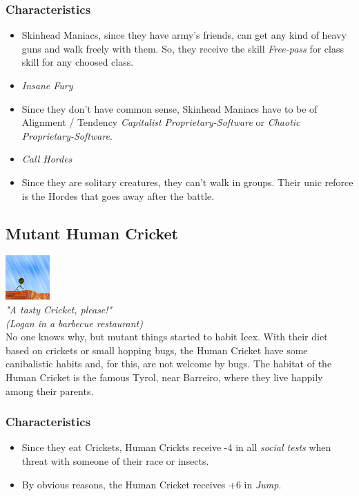 \documentclass[ letterpaper,12pt]{article}
\begin{document}
\subsubsection{Characteristics}
\begin{itemize}
\item{Skinhead Maniacs, since they have army's friends, can get any kind of heavy guns and walk freely with them. So, they receive the skill {\it Free-pass} for class skill for any choosed class.}
\item{{\it Insane Fury}}
\item{Since they don't have common sense, Skinhead Maniacs have to be of Alignment / Tendency {\it Capitalist Proprietary-Software} or {\it Chaotic Proprietary-Software}.}
\item{{\it Call Hordes}}
\item{Since they are solitary creatures, they can't walk in groups. Their unic reforce is the Hordes that goes away after the battle.}
\end{itemize}

\subsection{Mutant Human Cricket}
\includegraphics{../data/races/Img/grilo.png}\\
{\it "A tasty Cricket, please!"\\
(Logan in a barbecue restaurant)}\\

No one knows why, but mutant things started to habit Icex. With their diet
based on crickets or small hopping bugs, the Human Cricket have some
canibalistic habits and, for this, are not welcome by bugs. The habitat of the
Human Cricket is the famous Tyrol, near Barreiro, where they live happily
among their parents.

\subsubsection{Characteristics}
\begin{itemize}
\item{Since they eat Crickets, Human Crickts receive -4 in all {\it social tests} when threat with someone of their race or insects.}
\item{By obvious reasons, the Human Cricket receives +6 in {\it Jump}.}
\end{itemize}
\end{document}
